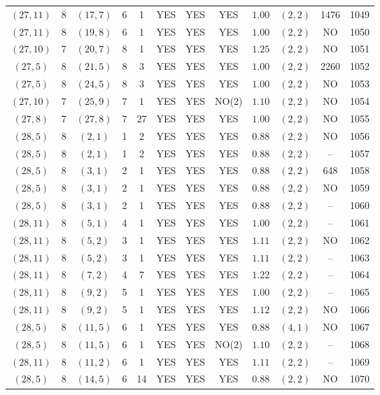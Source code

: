 \begin{longtable}{|c|c|c|c|c|c|c|c|c|c|c|c|}
$(27,11)$ & 8 & $(17,7)$ & 6 & 1 & YES & YES & YES & $1.00$ & $(2,2)$ & 1476 & 1049\\
$(27,11)$ & 8 & $(19,8)$ & 6 & 1 & YES & YES & YES & $1.00$ & $(2,2)$ & NO & 1050\\
$(27,10)$ & 7 & $(20,7)$ & 8 & 1 & YES & YES & YES & $1.25$ & $(2,2)$ & NO & 1051\\
$(27,5)$ & 8 & $(21,5)$ & 8 & 3 & YES & YES & YES & $1.00$ & $(2,2)$ & 2260 & 1052\\
$(27,5)$ & 8 & $(24,5)$ & 8 & 3 & YES & YES & YES & $1.00$ & $(2,2)$ & NO & 1053\\
$(27,10)$ & 7 & $(25,9)$ & 7 & 1 & YES & YES & NO(2) & $1.10$ & $(2,2)$ & NO & 1054\\
$(27,8)$ & 7 & $(27,8)$ & 7 & 27 & YES & YES & YES & $1.00$ & $(2,2)$ & NO & 1055\\
$(28,5)$ & 8 & $(2,1)$ & 1 & 2 & YES & YES & YES & $0.88$ & $(2,2)$ & NO & 1056\\
$(28,5)$ & 8 & $(2,1)$ & 1 & 2 & YES & YES & YES & $0.88$ & $(2,2)$ & -- & 1057\\
$(28,5)$ & 8 & $(3,1)$ & 2 & 1 & YES & YES & YES & $0.88$ & $(2,2)$ & 648 & 1058\\
$(28,5)$ & 8 & $(3,1)$ & 2 & 1 & YES & YES & YES & $0.88$ & $(2,2)$ & NO & 1059\\
$(28,5)$ & 8 & $(3,1)$ & 2 & 1 & YES & YES & YES & $0.88$ & $(2,2)$ & -- & 1060\\
$(28,11)$ & 8 & $(5,1)$ & 4 & 1 & YES & YES & YES & $1.00$ & $(2,2)$ & -- & 1061\\
$(28,11)$ & 8 & $(5,2)$ & 3 & 1 & YES & YES & YES & $1.11$ & $(2,2)$ & NO & 1062\\
$(28,11)$ & 8 & $(5,2)$ & 3 & 1 & YES & YES & YES & $1.11$ & $(2,2)$ & -- & 1063\\
$(28,11)$ & 8 & $(7,2)$ & 4 & 7 & YES & YES & YES & $1.22$ & $(2,2)$ & -- & 1064\\
$(28,11)$ & 8 & $(9,2)$ & 5 & 1 & YES & YES & YES & $1.00$ & $(2,2)$ & -- & 1065\\
$(28,11)$ & 8 & $(9,2)$ & 5 & 1 & YES & YES & YES & $1.12$ & $(2,2)$ & NO & 1066\\
$(28,5)$ & 8 & $(11,5)$ & 6 & 1 & YES & YES & YES & $0.88$ & $(4,1)$ & NO & 1067\\
$(28,5)$ & 8 & $(11,5)$ & 6 & 1 & YES & YES & NO(2) & $1.10$ & $(2,2)$ & -- & 1068\\
$(28,11)$ & 8 & $(11,2)$ & 6 & 1 & YES & YES & YES & $1.11$ & $(2,2)$ & -- & 1069\\
$(28,5)$ & 8 & $(14,5)$ & 6 & 14 & YES & YES & YES & $0.88$ & $(2,2)$ & NO & 1070\\

\end{longtable}
